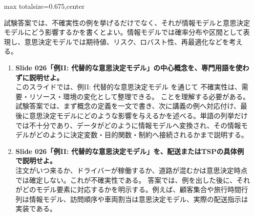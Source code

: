\begin{adjustbox}{max totalsize={\textwidth}{0.675\textheight},center}
\begin{minipage}{\textwidth}
\begin{minipage}[t]{0.485\textwidth}
試験答案では、不確実性の例を挙げるだけでなく、それが情報モデルと意思決定モデルにどう影響するかを書くとよい。情報モデルでは確率分布や区間として表現し、意思決定モデルでは期待値、リスク、ロバスト性、再最適化などを考える。\par
{}
\begin{enumerate}
\item \textbf{Slide 026「例II: 代替的な意思決定モデル」の中心概念を、専門用語を使わずに説明せよ。}\\このスライドでは、例II: 代替的な意思決定モデル を通じて 不確実性は、需要・リソース・環境の変化として整理できる。 ことを理解する必要がある。試験答案では、まず概念の定義を一文で書き、次に講義の例へ対応付け、最後に意思決定モデルにどのような影響を与えるかを述べる。単語の列挙だけでは不十分であり、データがどのように情報モデルへ変換され、その情報モデルがどのように決定変数・目的関数・制約へ接続されるかまで説明する。
\item \textbf{Slide 026「例II: 代替的な意思決定モデル」を、配送またはTSPの具体例で説明せよ。}\\注文がいつ来るか、ドライバーが稼働するか、道路が混むかは意思決定時点では確定しない。これが不確実性である。 答案では、例を出した後に、それがどのモデル要素に対応するかを明示する。例えば、顧客集合や旅行時間行列は情報モデル、訪問順序や車両割当は意思決定モデル、実際の配送指示は実装である。
\end{enumerate}
\end{minipage}
\end{minipage}
\end{adjustbox}

